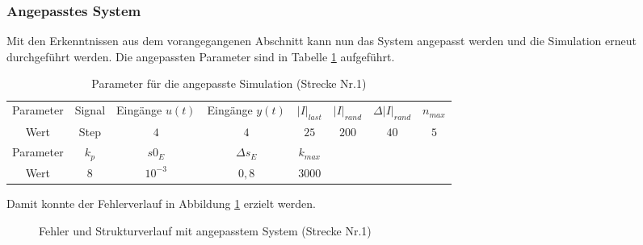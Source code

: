             \subsubsection{Angepasstes System}
                Mit den Erkenntnissen aus dem vorangegangenen Abschnitt kann nun das System angepasst werden und die Simulation erneut durchgeführt werden. Die angepassten Parameter 
                sind in Tabelle \ref{Tab:ParameterAngepasst} aufgeführt. 
                \begin{table}[h]
                    \begin{tabular}{c||ccccccc}
                        Parameter &Signal&Eingänge $u(t)$&Eingänge $y(t)$&$|I|_{last}$&$|I|_{rand}$&$\Delta|I|_{rand}$&$n_{max}$\\
                        Wert &Step&$4$&$4$&$25$&$200$&$40$&$5$\\
                        \hline
                        \hline
                        Parameter &$k_{p}$&$s0_{E}$&$\Delta s_{E}$&$k_{max}$&&&\\
                        Wert &$8$&$10^{-3}$&$0{,}8$&$3000$&&&\\
                    \end{tabular}
                    \centering
                    \caption{Parameter für die angepasste Simulation (Strecke Nr.1)}
                    \label{Tab:ParameterAngepasst}
                \end{table}
                Damit konnte der Fehlerverlauf in Abbildung \ref{Abb:RealTime_Testreihe101} erzielt werden.
                \begin{figure}[h]
                    \caption{Fehler und Strukturverlauf mit angepasstem System (Strecke Nr.1)}
                    \label{Abb:RealTime_Testreihe101}
                \end{figure}
